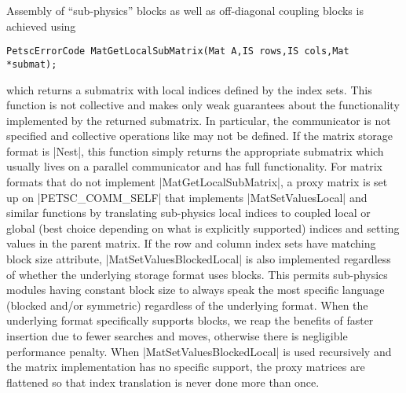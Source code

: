 Assembly of ``sub-physics'' blocks as well as off-diagonal coupling blocks is achieved using
\begin{verbatim}
PetscErrorCode MatGetLocalSubMatrix(Mat A,IS rows,IS cols,Mat *submat);
\end{verbatim}
which returns a submatrix with local indices defined by the index sets.
This function is not collective and makes only weak guarantees about the functionality implemented by the returned submatrix.
In particular, the communicator is not specified and collective operations like {\MatMult} may not be defined.
If the matrix storage format is \cverb|Nest|, this function simply returns the appropriate submatrix which usually lives on a parallel communicator and has full functionality.
For matrix formats that do not implement \cfunc|MatGetLocalSubMatrix|, a proxy matrix is set up on \cverb|PETSC_COMM_SELF| that implements \cfunc|MatSetValuesLocal| and similar functions by translating sub-physics local indices to coupled local or global (best choice depending on what is explicitly supported) indices and setting values in the parent matrix.
If the row and column index sets have matching block size attribute, \cfunc|MatSetValuesBlockedLocal| is also implemented regardless of whether the underlying storage format uses blocks.
This permits sub-physics modules having constant block size to always speak the most specific language (blocked and/or symmetric) regardless of the underlying format.
When the underlying format specifically supports blocks, we reap the benefits of faster insertion due to fewer searches and moves, otherwise there is negligible performance penalty.
When \cfunc|MatSetValuesBlockedLocal| is used recursively and the matrix implementation has no specific support, the proxy matrices are flattened so that index translation is never done more than once.
